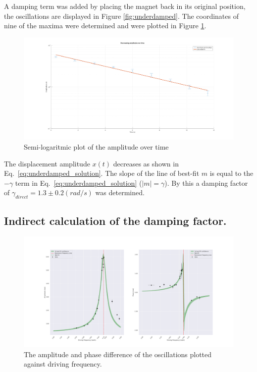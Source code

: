 A damping term was added by placing the magnet back in its original position, the oscillations are displayed in Figure \ref{fig:underdamped}. The coordinates of nine of the maxima were determined and were plotted in Figure \ref{fig:log of damping factor}. 

\begin{figure}[h!]
  \centering
  \includegraphics[width=1\textwidth]{oscillations/images/unnamed}
  \caption{Semi-logaritmic plot of the amplitude over time}
  \label{fig:log of damping factor}
\end{figure}

The displacement amplitude $x(t)$ decreases as shown in Eq.~\eqref{eq:underdamped_solution}. The slope of the line of best-fit $m$ is equal to the $-\gamma$ term in Eq.~\eqref{eq:underdamped_solution} ($|m| = \gamma $). By this a damping factor of $\gamma_{direct} = 1.3 \pm 0.2 (rad/s)$ was determined.

\subsection{Indirect calculation of the damping factor.}

\begin{figure}[H]
  \centering
  \includegraphics[width=1\textwidth]{oscillations/images/resonance}
  \caption{The amplitude and phase difference of the oscillations plotted against driving frequency.}
  \label{fig:resonance}
\end{figure}

